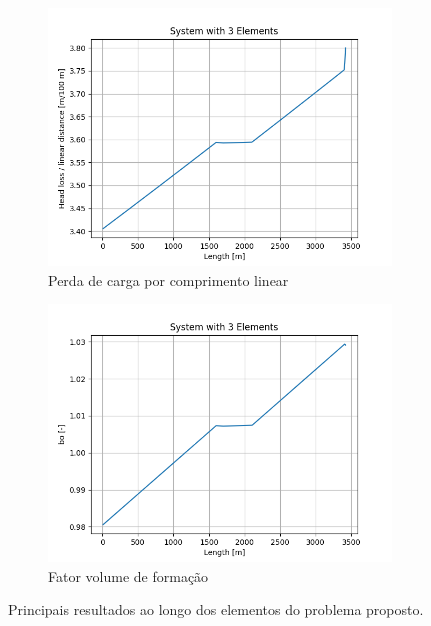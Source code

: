 \documentclass[final,3p]{elsarticle}
\numberwithin{equation}{section}
\begin{document}
\begin{figure}
          \begin{subfigure}{0.45\textwidth}
            \includegraphics[width=\textwidth]{flow/system1_hl.png}
            \caption{Perda de carga por comprimento linear}
          \end{subfigure}
          \hfill
          \begin{subfigure}{0.45\textwidth}
            \includegraphics[width=\textwidth]{flow/system1_bo.png}
            \caption{Fator volume de formação}
          \end{subfigure}

          \caption{Principais resultados ao longo dos elementos do problema proposto.}
          \label{fig:resultados}
        \end{figure}
\end{document}
